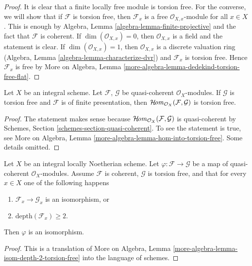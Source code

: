 \begin{proof}
It is clear that a finite locally free module is torsion free.
For the converse, we will show that if $\mathcal{F}$ is
torsion free, then $\mathcal{F}_x$ is a free $\mathcal{O}_{X, x}$-module
for all $x \in X$. This is enough by
Algebra, Lemma \ref{algebra-lemma-finite-projective}
and the fact that $\mathcal{F}$ is coherent.
If $\dim(\mathcal{O}_{X, x}) = 0$, then
$\mathcal{O}_{X, x}$ is a field and the statement is clear.
If $\dim(\mathcal{O}_{X, x}) = 1$, then $\mathcal{O}_{X, x}$
is a discrete valuation ring
(Algebra, Lemma \ref{algebra-lemma-characterize-dvr})
and $\mathcal{F}_x$ is torsion free.
Hence $\mathcal{F}_x$ is free by More on Algebra, Lemma
\ref{more-algebra-lemma-dedekind-torsion-free-flat}.
\end{proof}

\begin{lemma}
\label{lemma-hom-into-torsion-free}
Let $X$ be an integral scheme. Let $\mathcal{F}$, $\mathcal{G}$ be
quasi-coherent $\mathcal{O}_X$-modules.
If $\mathcal{G}$ is torsion free and $\mathcal{F}$ is of finite presentation,
then $\mathop{\mathcal{H}\!\mathit{om}}\nolimits_{\mathcal{O}_X}(\mathcal{F}, \mathcal{G})$ is torsion free.
\end{lemma}

\begin{proof}
The statement makes sense because
$\mathop{\mathcal{H}\!\mathit{om}}\nolimits_{\mathcal{O}_X}(\mathcal{F}, \mathcal{G})$
is quasi-coherent by Schemes, Section \ref{schemes-section-quasi-coherent}.
To see the statement is true, see
More on Algebra, Lemma \ref{more-algebra-lemma-hom-into-torsion-free}.
Some details omitted.
\end{proof}

\begin{lemma}
\label{lemma-isom-depth-2-torsion-free}
Let $X$ be an integral locally Noetherian scheme. Let
$\varphi : \mathcal{F} \to \mathcal{G}$ be a map of
quasi-coherent $\mathcal{O}_X$-modules. Assume $\mathcal{F}$ is coherent,
$\mathcal{G}$ is torsion free, and that for every $x \in X$ one of the
following happens
\begin{enumerate}
\item $\mathcal{F}_x \to \mathcal{G}_x$ is an isomorphism, or
\item $\text{depth}(\mathcal{F}_x) \geq 2$.
\end{enumerate}
Then $\varphi$ is an isomorphism.
\end{lemma}

\begin{proof}
This is a translation of More on Algebra, Lemma
\ref{more-algebra-lemma-isom-depth-2-torsion-free}
into the language of schemes.
\end{proof}








